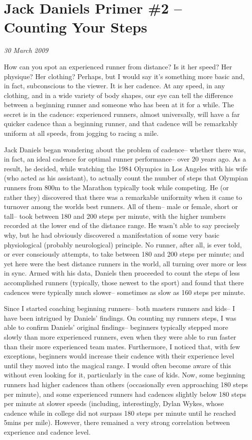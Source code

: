 \chapter{Jack Daniels Primer \#2 -- Counting Your Steps}
\textit{30 March 2009}
\bigskip

How can you spot an experienced runner from distance? Is it her speed? Her physique? Her clothing? Perhaps, but I would say it's something more basic and, in fact, subconscious to the viewer. It is her cadence. At any speed, in any clothing, and in a wide variety of body shapes, our eye can tell the difference between a beginning runner and someone who has been at it for a while. The secret is in the cadence: experienced runners, almost universally, will have a far quicker cadence than a beginning runner, and that cadence will be remarkably uniform at all speeds, from jogging to racing a mile.

Jack Daniels began wondering about the problem of cadence-- whether there was, in fact, an ideal cadence for optimal runner performance-- over 20 years ago. As a result, he decided, while watching the 1984 Olympics in Los Angeles with his wife (who acted as his assistant), to actually count the number of steps that Olympian runners from 800m to the Marathon typically took while competing. He (or rather they) discovered that there was a remarkable uniformity when it came to turnover among the worlds best runners. All of them-- male or female, short or tall-- took between 180 and 200 steps per minute, with the higher numbers recorded at the lower end of the distance range. He wasn't able to say precisely why, but he had obviously discovered a manifestation of some very basic physiological (probably neurological) principle. No runner, after all, is ever told, or ever consciously attempts, to take between 180 and 200 steps per minute; and yet here were the best distance runners in the world, all turning over more or less in sync. Armed with his data, Daniels then proceeded to count the steps of less accomplished runners (typically, those newest to the sport) and found that there cadences were typically much slower-- sometimes as slow as 160 steps per minute.

Since I started coaching beginning runners-- both masters runners and kids-- I have been intrigued by Daniels' findings. On counting my runners steps, I was able to confirm Daniels' original findings-- beginners typically stepped more slowly than more experienced runners, even when they were able to run faster than their more experienced team mates. Furthermore, I noticed that, with few exceptions, beginners would increase their cadence with their experience level until they moved into the magical range. I would often become aware of this without even looking for it, particularly in the case of kids. Now, some beginning runners had higher cadences than others (occasionally even approaching 180 steps per minute), and some experienced runners had cadences slightly below 180 steps per minute at slower speeds (including, interestingly, Dylan Wykes, whose cadence while in college did not surpass 180 steps per minute until he reached 5mins per mile). However, there remained a very strong correlation between experience and cadence level.

